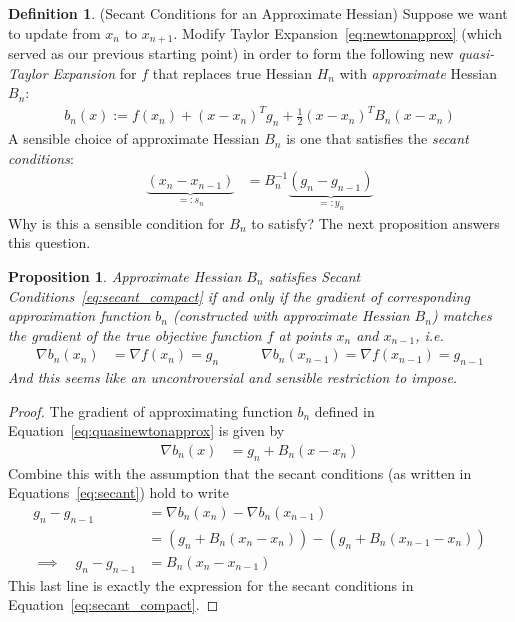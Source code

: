 \documentclass[12pt]{book}
\numberwithin{equation}{section} %
\theoremstyle{plain}
\newtheorem{prop}[thm]{Proposition}
\theoremstyle{definition}
\newtheorem{defn}[thm]{Definition}
\theoremstyle{remark}
\begin{document}
\begin{defn}(Secant Conditions for an Approximate Hessian)
Suppose we want to update from $x_n$ to $x_{n+1}$.
Modify Taylor Expansion~\ref{eq:newtonapprox} (which served as our
previous starting point) in order to form the following new
\emph{quasi-Taylor Expansion} for $f$ that replaces true Hessian $H_n$
with \emph{approximate} Hessian $B_n$:
\begin{align}
  b_n(x) := f(x_n) + (x-x_n)^Tg_n + \frac{1}{2}(x-x_n)^T B_n (x-x_n)
  \label{eq:quasinewtonapprox}
\end{align}
A sensible choice of approximate Hessian $B_n$ is one that satisfies the
\emph{secant conditions}:
\begin{align}
  \underbrace{(x_{n}-x_{n-1})}_{=:s_n}
  &=
  B_n^{-1}\underbrace{(g_{n}-g_{n-1})}_{=:y_n} \label{eq:secant_compact}
\end{align}
Why is this a sensible condition for $B_n$ to satisfy? The next
proposition answers this question.
\end{defn}

\begin{prop}
Approximate Hessian $B_n$ satisfies Secant
Conditions~\ref{eq:secant_compact} if and only if the gradient of
corresponding approximation function $b_n$ (constructed with approximate
Hessian $B_n$) \emph{matches} the gradient of the \emph{true} objective
function $f$ at points $x_n$ and $x_{n-1}$, i.e.
\begin{align}
  \nabla b_n(x_n) &= \nabla f(x_n) = g_n
  \qquad\quad
  \nabla b_n(x_{n-1}) = \nabla f(x_{n-1}) = g_{n-1}
  \label{eq:secant}
\end{align}
And this seems like an uncontroversial and sensible restriction to
impose.
\end{prop}
\begin{proof}
The gradient of approximating function $b_n$ defined in
Equation~\ref{eq:quasinewtonapprox} is given by
\begin{align*}
  \nabla b_n(x) &= g_n + B_n(x-x_n)
\end{align*}
Combine this with the assumption that the secant conditions (as written
in Equations~\ref{eq:secant}) hold to write
\begin{align*}
  g_n - g_{n-1}
  &= \nabla b_n(x_n) - \nabla b_n(x_{n-1}) \\
  &= (g_n + B_n(x_n-x_n)) - (g_n + B_n(x_{n-1}-x_n)) \\
  \implies\quad
  g_n - g_{n-1}
  &= B_n(x_{n}-x_{n-1})
\end{align*}
This last line is exactly the expression for the secant conditions in
Equation~\ref{eq:secant_compact}.
\end{proof}
\end{document}
